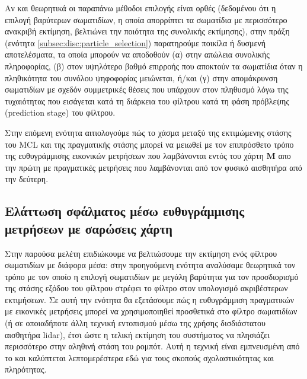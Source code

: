 Αν και θεωρητικά οι παραπάνω μέθοδοι επιλογής είναι ορθές (δεδομένου ότι η
επιλογή βαρύτερων σωματιδίων, η οποία απορρίπτει τα σωματίδια με περισσότερο
ανακριβή εκτίμηση, βελτιώνει την ποιότητα της συνολικής εκτίμησης), στην πράξη
(ενότητα \ref{subsec:disc:particle_selection}) παρατηρούμε ποικίλα ή δυσμενή
αποτελέσματα, τα οποία μπορούν να αποδοθούν (α) στην απώλεια συνολικής
πληροφορίας, (β) στον υψηλότερο βαθμό επιρροής που αποκτούν τα σωματίδια όταν η
πληθικότητα του συνόλου ψηφοφορίας μειώνεται, ή/και (γ) στην απομάκρυνση
σωματιδίων με σχεδόν συμμετρικές θέσεις που υπάρχουν στον πληθυσμό λόγω της
τυχαιότητας που εισάγεται κατά τη διάρκεια του φίλτρου κατά τη φάση πρόβλεψης
(prediction stage) του φίλτρου.

Στην επόμενη ενότητα αιτιολογούμε πώς το χάσμα μεταξύ της εκτιμώμενης στάσης
του MCL και της πραγματικής στάσης μπορεί να μειωθεί με τον επιπρόσθετο τρόπο
της ευθυγράμμισης εικονικών μετρήσεων που λαμβάνονται εντός του χάρτη $\bm{M}$
απο την πρώτη με πραγματικές μετρήσεις που λαμβάνονται από τον φυσικό
αισθητήρα από την δεύτερη.

\subsection{Ελάττωση σφάλματος μέσω ευθυγράμμισης μετρήσεων με σαρώσεις χάρτη}
\label{subsection:02_02_03:02}

Στην παρούσα μελέτη επιδιώκουμε να βελτιώσουμε την εκτίμηση ενός φίλτρου
σωματιδίων με διάφορα μέσα: στην προηγούμενη ενότητα αναλύσαμε θεωρητικά τον
τρόπο με τον οποίο η επιλογή σωματιδίων με μεγάλη βαρύτητα για τον προσδιορισμό
της στάσης εξόδου του φίλτρου στρέφει το φίλτρο στον υπολογισμό ακριβέστερων
εκτιμήσεων.  Σε αυτή την ενότητα θα εξετάσουμε πώς η ευθυγράμμιση πραγματικών
με εικονικές μετρήσεις μπορεί να χρησιμοποιηθεί προσθετικά στο φίλτρο
σωματιδίων (ή σε οποιαδήποτε άλλη τεχνική εντοπισμού μέσω της χρήσης
δισδιάστατου αισθητήρα lidar), έτσι ώστε η τελική εκτίμηση του συστήματος να
πλησιάζει περισσότερο στην αληθινή στάση του ρομπότ.  Αυτή η τεχνική είναι
εμπνευσμένη από το \cite{Vasiljevic2016a} και καλύπτεται λεπτομερέστερα εδώ για
τους σκοπούς σχολαστικότητας και πληρότητας.

